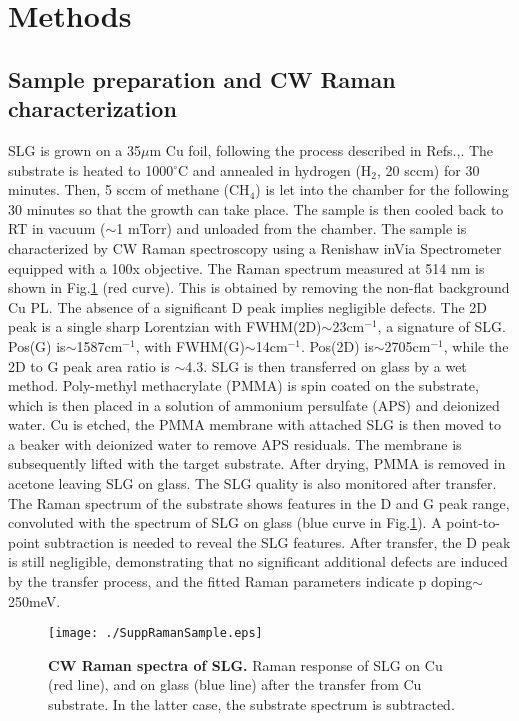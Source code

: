 \documentclass[aps, prl,twocolumn]{revtex4}
\begin{document}
\section*{Methods}
\subsection*{Sample preparation and CW Raman characterization}

SLG is grown on a 35$\mu$m Cu foil, following the process described in Refs.,. The substrate is heated to 1000$^{\circ}$C and annealed in hydrogen (H$_2$, 20 sccm) for 30 minutes. Then, 5 sccm of methane (CH$_4$) is let into the chamber for the following 30 minutes so that the growth can take place\cite{BaeNN2010,LiS2009}. The sample is then cooled back to RT in vacuum ($\sim$1 mTorr) and unloaded from the chamber. The sample is characterized by CW Raman spectroscopy using a Renishaw inVia Spectrometer equipped with a 100x objective. The Raman spectrum measured at 514 nm is shown in Fig.\ref{figSRaman} (red curve). This is obtained by removing the non-flat background Cu PL\cite{LagaAPL2013}. The absence of a significant D peak implies negligible defects\cite{FerrariNN2013,FerrariPRL2006,CancNL2011,FerrariPRB2000}. The 2D peak is a single sharp Lorentzian with FWHM(2D)$\sim$23cm$^{-1}$, a signature of SLG\cite{FerrariPRL2006}. Pos(G) is$\sim$1587cm$^{-1}$, with FWHM(G)$\sim$14cm$^{-1}$. Pos(2D) is$\sim$2705cm$^{-1}$, while the 2D to G peak area ratio is $\sim$4.3. SLG is then transferred on glass by a wet method\cite{bonaccorso2012}. Poly-methyl methacrylate (PMMA) is spin coated on the substrate, which is then placed in a solution of ammonium persulfate (APS) and deionized water. Cu is etched\cite{BaeNN2010,bonaccorso2012}, the PMMA membrane with attached SLG is then moved to a beaker with deionized water to remove APS residuals. The membrane is subsequently lifted with the target substrate. After drying, PMMA is removed in acetone leaving SLG on glass. The SLG quality is also monitored after transfer. The Raman spectrum of the substrate shows features in the D and G peak range, convoluted with the spectrum of SLG on glass (blue curve in Fig.\ref{figSRaman}). A point-to-point subtraction is needed to reveal the SLG features. After transfer, the D peak is still negligible, demonstrating that no significant additional defects are induced by the transfer process, and the fitted Raman parameters indicate p doping$\sim$250meV\cite{BaskPRB2009, DasNN2008}.
\begin{figure}
	\centerline{\texttt{[image: ./SuppRamanSample.eps]}}
	\caption{\textbf{CW Raman spectra of SLG.} Raman response of SLG on Cu (red line), and on glass (blue line) after the transfer from Cu substrate. In the latter case, the substrate spectrum is subtracted.}
	\label{figSRaman}
\end{figure}
\end{document}

